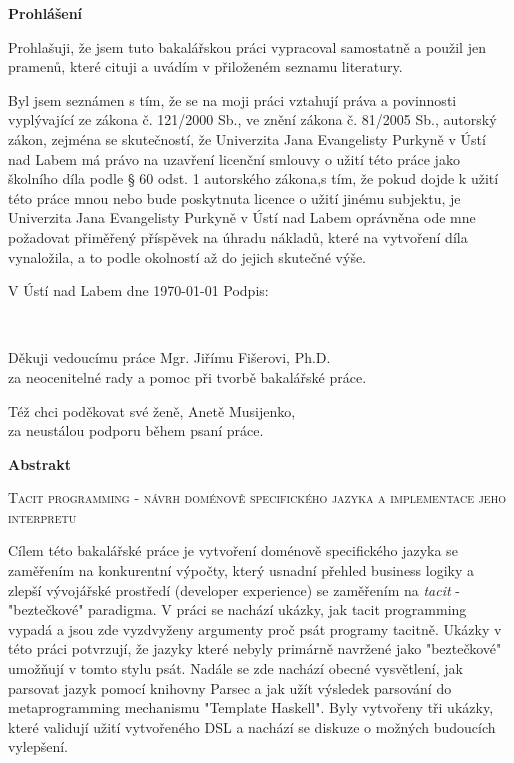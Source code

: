 \documentclass[male,czech]{kithesis}
\newcommand{\TITULcz}{Tacit programming - návrh doménově specifického jazyka a implementace jeho interpretu} %
\begin{document}
\cleardoublepage
\thispagestyle{empty}

\textbf{Prohlášení}

Prohlašuji, že jsem tuto bakalářskou práci vypracoval samostatně a použil
jen pramenů, které cituji a uvádím v přiloženém seznamu literatury.

\vspace{1em}
Byl jsem seznámen s tím, že se na moji práci vztahují práva a povinnosti vyplývající ze zákona č. 121/2000 Sb., ve znění zákona č. 81/2005 Sb., autorský zákon, zejména se skutečností, že Univerzita Jana Evangelisty Purkyně v Ústí nad Labem má právo na uzavření licenční smlouvy o užití této práce jako školního díla podle § 60 odst. 1 autorského zákona,s tím, že pokud dojde k užití této práce mnou nebo bude poskytnuta licence o užití jinému
subjektu, je Univerzita Jana Evangelisty Purkyně v Ústí nad Labem oprávněna ode mne požadovat přiměřený příspěvek na úhradu nákladů, které na vytvoření díla vynaložila, a to podle okolností až do jejich skutečné výše.

\vspace{1em}
V Ústí nad Labem dne \today \hspace{0.3\textwidth} Podpis:


\clearpage
\thispagestyle{empty}
~\vfill

\begin{flushright}
  Děkuji vedoucímu práce Mgr. Jiřímu Fišerovi, Ph.D.\\ za neocenitelné rady a pomoc při tvorbě bakalářské práce.

  Též chci poděkovat své ženě, Anetě Musijenko, \\ za neustálou podporu během psaní práce.
\end{flushright}

\cleardoublepage
\thispagestyle{empty}

\textbf{\textsf{Abstrakt}}

\textsc{\TITULcz}

Cílem této bakalářské práce je vytvoření doménově specifického jazyka se zaměřením na konkurentní výpočty, 
který usnadní přehled business logiky a zlepší vývojářské prostředí (developer experience) se zaměřením na \textit{tacit} - "beztečkové" paradigma.
V práci se nachází ukázky, 
jak tacit programming vypadá a 
jsou zde vyzdvyženy argumenty proč psát programy tacitně.
Ukázky v této práci potvrzují, 
že jazyky které nebyly primárně navržené jako "beztečkové" 
umožňují v tomto stylu psát.
Nadále se zde nachází obecné vysvětlení, 
jak parsovat jazyk pomocí knihovny Parsec a
jak užít výsledek parsování do metaprogramming mechanismu "Template Haskell".
Byly vytvořeny tři ukázky, 
které validují užití vytvořeného DSL a
nachází se diskuze o možných budoucích vylepšení.
\end{document}
